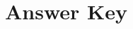 \documentclass[openany]{book}
\DeclareMathOperator{\disc}{disc}
\begin{document}















\chapter{Answer Key}
\end{document}
